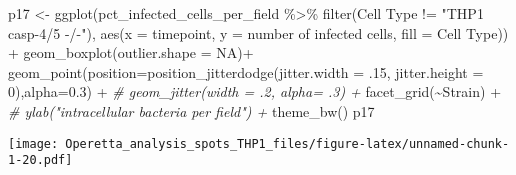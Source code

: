 \documentclass[
]{article}
\newenvironment{Shaded}{\begin{snugshade}}{\end{snugshade}}
\newcommand{\AttributeTok}[1]{\textcolor[rgb]{0.77,0.63,0.00}{#1}}
\newcommand{\CommentTok}[1]{\textcolor[rgb]{0.56,0.35,0.01}{\textit{#1}}}
\newcommand{\ConstantTok}[1]{\textcolor[rgb]{0.00,0.00,0.00}{#1}}
\newcommand{\DecValTok}[1]{\textcolor[rgb]{0.00,0.00,0.81}{#1}}
\newcommand{\FloatTok}[1]{\textcolor[rgb]{0.00,0.00,0.81}{#1}}
\newcommand{\FunctionTok}[1]{\textcolor[rgb]{0.00,0.00,0.00}{#1}}
\newcommand{\NormalTok}[1]{#1}
\newcommand{\OtherTok}[1]{\textcolor[rgb]{0.56,0.35,0.01}{#1}}
\newcommand{\SpecialCharTok}[1]{\textcolor[rgb]{0.00,0.00,0.00}{#1}}
\newcommand{\StringTok}[1]{\textcolor[rgb]{0.31,0.60,0.02}{#1}}
\begin{document}
\begin{Shaded}
\begin{Highlighting}[]
\NormalTok{p17 }\OtherTok{\textless{}{-}} \FunctionTok{ggplot}\NormalTok{(pct\_infected\_cells\_per\_field }\SpecialCharTok{\%\textgreater{}\%}
                \FunctionTok{filter}\NormalTok{(}\StringTok{\textasciigrave{}}\AttributeTok{Cell Type}\StringTok{\textasciigrave{}} \SpecialCharTok{!=} \StringTok{"THP1 casp{-}4/5 {-}/{-}"}\NormalTok{), }\FunctionTok{aes}\NormalTok{(}\AttributeTok{x =}\NormalTok{ timepoint, }\AttributeTok{y =} \StringTok{\textasciigrave{}}\AttributeTok{number of infected cells}\StringTok{\textasciigrave{}}\NormalTok{, }\AttributeTok{fill =} \StringTok{\textasciigrave{}}\AttributeTok{Cell Type}\StringTok{\textasciigrave{}}\NormalTok{)) }\SpecialCharTok{+}
  \FunctionTok{geom\_boxplot}\NormalTok{(}\AttributeTok{outlier.shape =} \ConstantTok{NA}\NormalTok{)}\SpecialCharTok{+}
  \FunctionTok{geom\_point}\NormalTok{(}\AttributeTok{position=}\FunctionTok{position\_jitterdodge}\NormalTok{(}\AttributeTok{jitter.width =}\NormalTok{ .}\DecValTok{15}\NormalTok{, }\AttributeTok{jitter.height =} \DecValTok{0}\NormalTok{),}\AttributeTok{alpha=}\FloatTok{0.3}\NormalTok{) }\SpecialCharTok{+}
  \CommentTok{\#  geom\_jitter(width = .2, alpha= .3) +}
  \FunctionTok{facet\_grid}\NormalTok{(}\SpecialCharTok{\textasciitilde{}}\NormalTok{Strain) }\SpecialCharTok{+}
  \CommentTok{\#  ylab("intracellular bacteria per field") +}
  \FunctionTok{theme\_bw}\NormalTok{()}
\NormalTok{p17}
\end{Highlighting}
\end{Shaded}

\texttt{[image: Operetta\_analysis\_spots\_THP1\_files/figure-latex/unnamed-chunk-1-20.pdf]}
\end{document}
